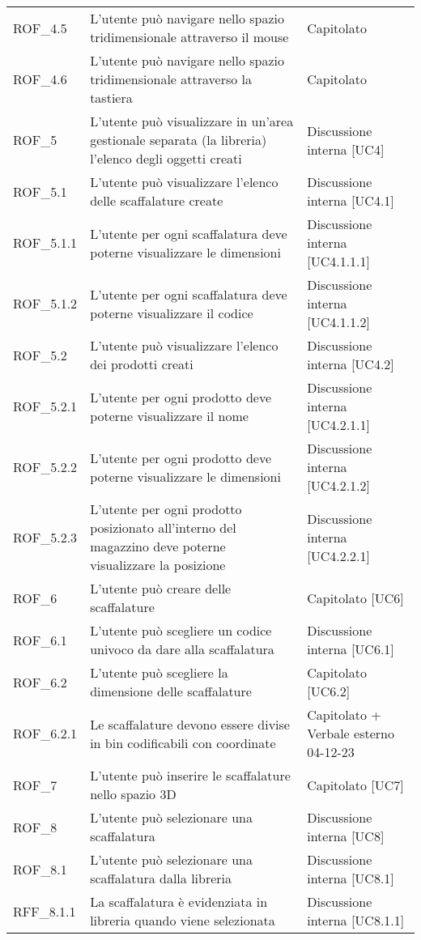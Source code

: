 \begin{xltabular}{\textwidth}{ p{0.2\textwidth} | X | p{0.2\textwidth} }
    ROF\_4.5& L'utente può navigare nello spazio tridimensionale attraverso il mouse& Capitolato\\
    ROF\_4.6& L'utente può navigare nello spazio tridimensionale attraverso la tastiera& Capitolato\\
    ROF\_5& L'utente può visualizzare in un'area gestionale separata (la libreria) l'elenco degli oggetti creati & Discussione interna [UC4] \\
    ROF\_5.1& L'utente può visualizzare l'elenco delle scaffalature create & Discussione interna [UC4.1] \\
    ROF\_5.1.1& L'utente per ogni scaffalatura deve poterne visualizzare le dimensioni & Discussione interna [UC4.1.1.1]\\
    ROF\_5.1.2& L'utente per ogni scaffalatura deve poterne visualizzare il codice & Discussione interna [UC4.1.1.2]\\
    ROF\_5.2& L'utente può visualizzare l'elenco dei prodotti creati & Discussione interna [UC4.2] \\
    ROF\_5.2.1& L'utente per ogni prodotto deve poterne visualizzare il nome & Discussione interna [UC4.2.1.1]\\
    ROF\_5.2.2& L'utente per ogni prodotto deve poterne visualizzare le dimensioni & Discussione interna [UC4.2.1.2]\\
    ROF\_5.2.3& L'utente per ogni prodotto posizionato all'interno del magazzino deve poterne visualizzare la posizione & Discussione interna [UC4.2.2.1] \\
    ROF\_6& L'utente può creare delle scaffalature & Capitolato [UC6]\\
    ROF\_6.1& L'utente può scegliere un codice univoco da dare alla scaffalatura & Discussione interna [UC6.1]\\
    ROF\_6.2& L'utente può scegliere la dimensione delle scaffalature & Capitolato [UC6.2]\\
    ROF\_6.2.1& Le scaffalature devono essere divise in bin codificabili con coordinate & Capitolato + Verbale esterno 04-12-23\\
    ROF\_7& L'utente può inserire le scaffalature nello spazio 3D & Capitolato [UC7]\\
    ROF\_8& L'utente può selezionare una scaffalatura & Discussione interna [UC8]\\
    ROF\_8.1& L'utente può selezionare una scaffalatura dalla libreria & Discussione interna [UC8.1]\\
    RFF\_8.1.1& La scaffalatura è evidenziata in libreria quando viene selezionata & Discussione interna [UC8.1.1]\\

\end{xltabular}
